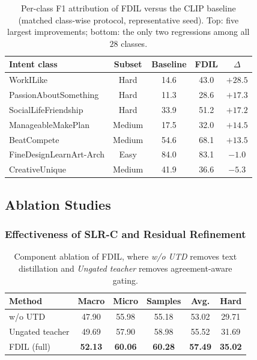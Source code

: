 \begin{table}[htbp]
\centering
\small
\caption{Per-class F1 attribution of FDIL versus the CLIP baseline (matched class-wise protocol, representative seed). Top: five largest improvements; bottom: the only two regressions among all $28$ classes.}
\label{tab:per_class_attr}
\setlength{\tabcolsep}{5pt}
\begin{tabular}{lcccc}
\hline
Intent class & Subset & Baseline & FDIL & $\Delta$ \\
\hline
WorkILike & Hard & 14.6 & 43.0 & $+28.5$ \\
PassionAboutSomething & Hard & 11.3 & 28.6 & $+17.3$ \\
SocialLifeFriendship & Hard & 33.9 & 51.2 & $+17.2$ \\
ManageableMakePlan & Medium & 17.5 & 32.0 & $+14.5$ \\
BeatCompete & Medium & 54.6 & 68.1 & $+13.5$ \\
\hline
FineDesignLearnArt-Arch & Easy & 84.0 & 83.1 & $-1.0$ \\
CreativeUnique & Medium & 41.9 & 36.6 & $-5.3$ \\
\hline
\end{tabular}
\end{table}
\fi

\subsection{Ablation Studies}

\subsubsection{Effectiveness of SLR-C and Residual Refinement}

\begin{table}[htbp]
\centering
\caption{Component ablation of FDIL, where \textit{w/o UTD} removes text distillation and \textit{Ungated teacher} removes agreement-aware gating.}
\label{tab:slrc_ablation}
\begin{tabular}{lccccc}
\hline
Method & Macro & Micro & Samples & Avg. & Hard \\
\hline
w/o UTD & 47.90 & 55.98 & 55.18 & 53.02 & 29.71 \\
Ungated teacher & 49.69 & 57.90 & 58.98 & 55.52 & 31.69 \\
FDIL (full) & \textbf{52.13} & \textbf{60.06} & \textbf{60.28} & \textbf{57.49} & \textbf{35.02} \\
\hline
\end{tabular}
\end{table}

